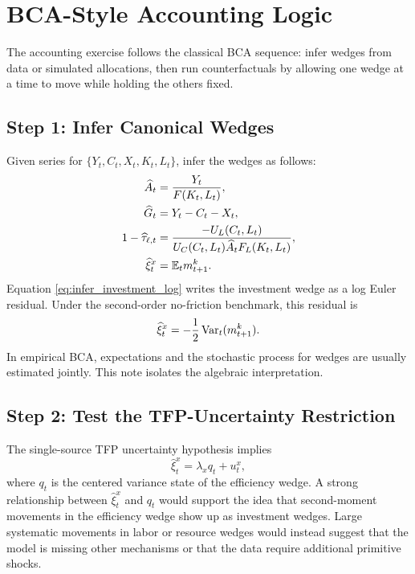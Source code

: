 \section{BCA-Style Accounting Logic}

The accounting exercise follows the classical BCA sequence: infer wedges from
data or simulated allocations, then run counterfactuals by allowing one wedge at
a time to move while holding the others fixed.

\subsection{Step 1: Infer Canonical Wedges}

Given series for \(\{Y_t,C_t,X_t,K_t,L_t\}\), infer the wedges as follows:
\begin{align}
    \widehat{A}_t
    &=
    \frac{Y_t}{F(K_t,L_t)},
    \label{eq:infer_efficiency}
    \\
    \widehat{G}_t
    &=
    Y_t-C_t-X_t,
    \label{eq:infer_government}
    \\
    1-\widehat{\tau}_{\ell,t}
    &=
    \frac{-U_L(C_t,L_t)}
    {U_C(C_t,L_t)\widehat{A}_tF_L(K_t,L_t)},
    \label{eq:infer_labor}
    \\
    \widehat{\xi}^x_t
    &=
    \mathbb{E}_t m^k_{t+1}.
    \label{eq:infer_investment_log}
\end{align}
Equation \eqref{eq:infer_investment_log} writes the investment wedge as a log
Euler residual. Under the second-order no-friction benchmark, this residual is
\[
    \widehat{\xi}^x_t
    =
    -\frac{1}{2}\operatorname{Var}_t(m^k_{t+1}).
\]
In empirical BCA, expectations and the stochastic process for wedges are usually
estimated jointly. This note isolates the algebraic interpretation.

\subsection{Step 2: Test the TFP-Uncertainty Restriction}

The single-source TFP uncertainty hypothesis implies
\begin{equation}
    \widehat{\xi}^x_t
    =
    \lambda_x q_t + u^x_t,
    \label{eq:test_investment_loading}
\end{equation}
where \(q_t\) is the centered variance state of the efficiency wedge. A strong
relationship between \(\widehat{\xi}^x_t\) and \(q_t\) would support the idea
that second-moment movements in the efficiency wedge show up as investment
wedges. Large systematic movements in labor or resource wedges would instead
suggest that the model is missing other mechanisms or that the data require
additional primitive shocks.

